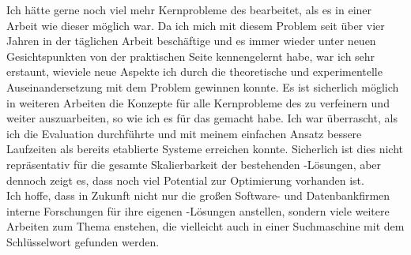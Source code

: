 Ich hätte gerne noch viel mehr Kernprobleme des \IMfull bearbeitet, als es in einer Arbeit wie dieser möglich war. Da ich mich mit diesem Problem seit über vier Jahren in der täglichen Arbeit beschäftige und es immer wieder unter neuen Gesichtspunkten von der praktischen Seite kennengelernt habe, war ich sehr erstaunt, wieviele neue Aspekte ich durch die theoretische und experimentelle Auseinandersetzung mit dem Problem gewinnen konnte. Es ist sicherlich möglich in weiteren Arbeiten die Konzepte für alle Kernprobleme des \IM zu verfeinern und weiter auszuarbeiten, so wie ich es für das  gemacht habe. Ich war überrascht, als ich die Evaluation durchführte und mit meinem einfachen Ansatz bessere Laufzeiten als bereits etablierte Systeme erreichen konnte. Sicherlich ist dies nicht repräsentativ für die gesamte Skalierbarkeit der bestehenden \ORM-Lösungen, aber dennoch zeigt es, dass noch viel Potential zur Optimierung vorhanden ist.\\
Ich hoffe, dass in Zukunft nicht nur die großen Software- und Datenbankfirmen interne Forschungen für ihre eigenen \IM-Lösungen anstellen, sondern viele weitere Arbeiten zum Thema enstehen, die vielleicht auch in einer Suchmaschine mit dem Schlüsselwort \IMfull gefunden werden.
